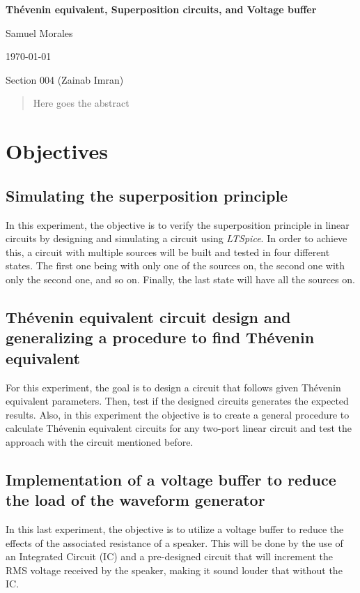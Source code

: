 \documentclass[english,12pt]{article}
\newcommand{\writetitle}{Thévenin equivalent, Superposition circuits, and Voltage buffer}
\newcommand{\writename}{Samuel Morales}
\newcommand{\writesubtitle}{Section 004 (Zainab Imran)}
\begin{document}
\thispagestyle{plain}
	\begin{center}
	\hspace{0pt}
	{\large\textbf{{\writetitle}}}

    \writename
    
    \today
    
	\writesubtitle

\end{center}
\begin{abstract}
    Here goes the abstract
\end{abstract}
\newpage
\section{Objectives}
\subsection{Simulating the superposition principle}

In this experiment, the objective is to verify the superposition principle in linear circuits by designing and simulating a circuit using \textit{LTSpice}. In order to achieve this, a circuit with multiple sources will be built and tested in four different states. The first one being with only one of the sources on, the second one with only the second one, and so on. Finally, the last state will have all the sources on. 

\subsection{Thévenin equivalent circuit design and generalizing a procedure to find Thévenin equivalent}

For this experiment, the goal is to design a circuit that follows given Thévenin equivalent parameters. Then, test if the designed circuits generates the expected results. Also, in this experiment the objective is to create a general procedure to calculate Thévenin equivalent circuits for any two-port linear circuit and test the approach with the circuit mentioned before.

\subsection{Implementation of a voltage buffer to reduce the load of the waveform generator}

In this  last experiment, the objective is to utilize a voltage buffer to reduce the effects of the associated resistance of a speaker. This will be done by the use of an Integrated Circuit (IC) and a pre-designed circuit that will increment the RMS voltage received by the speaker, making it sound louder that without the IC.
\end{document}
